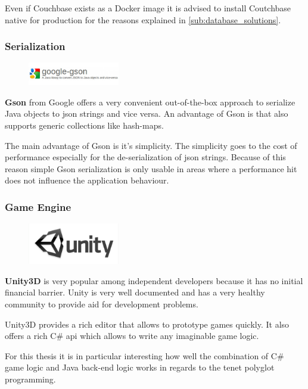 Even if Couchbase exists as a Docker image it is advised to install
Coutchbase native for production for the reasons explained in
\autoref{sub:database_solutions}.
    
\subsubsection{Serialization}

\begin{figure}
    \includegraphics[width=4cm]{images/dependencies/google-gson}
\end{figure}

\textbf{Gson} from Google offers a very convenient out-of-the-box approach to
serialize Java objects to \gls{json} strings and vice versa. An advantage of
Gson is that also supports generic collections like hash-maps.

The main advantage of Gson is it's simplicity. The simplicity goes to the cost
of performance especially for the de-serialization of \gls{json} strings.
Because of this reason simple Gson serialization is only usable in areas where a
performance hit does not influence the application behaviour.

\subsubsection{Game Engine}

\begin{figure}
    \includegraphics[width=4cm]{images/dependencies/Unity3D}
\end{figure}
    
\textbf{Unity3D} is very popular among independent developers because it has no
initial financial barrier. Unity is very well documented and has a very
healthy community to provide aid for development problems.

Unity3D provides a rich editor that allows to prototype games quickly. It
also offers a rich C\# \gls{api} which allows to write any imaginable game logic. 

For this thesis it is in particular interesting how well the combination of
C\# game logic and Java back-end logic works in regards to the \ms{} tenet
polyglot programming.
    



